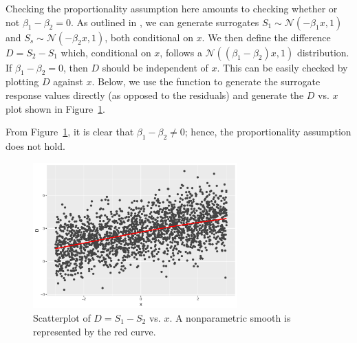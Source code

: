 Checking the proportionality assumption here amounts to checking whether or not $\beta_1 - \beta_2 = 0$. As outlined in \citet{residuals-liu-2017}, we can generate surrogates $S_1 \sim \mathcal{N}\left(-\beta_1 x, 1\right)$ and $S_s \sim \mathcal{N}\left(-\beta_2 x, 1\right)$, both conditional on $x$. We then define the difference $D = S_2 - S_1$ which, conditional on $x$, follows a $\mathcal{N}\left(\left(\beta_1 - \beta_2\right) x, 1\right)$ distribution. If $\beta_1 - \beta_2 = 0$, then $D$ should be independent of $x$. This can be easily checked by plotting $D$ against $x$. Below, we use the  function to generate the surrogate response values directly (as opposed to the residuals) and generate the $D$ vs. $x$ plot shown in Figure~\ref{fig:proportionality}.
From Figure~\ref{fig:proportionality}, it is clear that $\beta_1 - \beta_2 $; hence, the proportionality assumption does not hold.

\begin{figure}[!htbp]
  \centering
  \includegraphics[width=0.7\textwidth]{proportionality}
  \caption{Scatterplot of $D = S_1 - S_2$ vs. $x$. A nonparametric smooth is represented by the red curve.}
  \label{fig:proportionality}
\end{figure}



